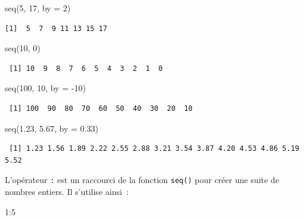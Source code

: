 \documentclass[
  letterpaper,
  DIV=11,
  numbers=noendperiod,
  oneside]{scrreprt}
\newenvironment{Shaded}{\begin{snugshade}}{\end{snugshade}}
\newcommand{\AttributeTok}[1]{\textcolor[rgb]{0.40,0.45,0.13}{#1}}
\newcommand{\DecValTok}[1]{\textcolor[rgb]{0.68,0.00,0.00}{#1}}
\newcommand{\FloatTok}[1]{\textcolor[rgb]{0.68,0.00,0.00}{#1}}
\newcommand{\FunctionTok}[1]{\textcolor[rgb]{0.28,0.35,0.67}{#1}}
\newcommand{\NormalTok}[1]{\textcolor[rgb]{0.00,0.23,0.31}{#1}}
\newcommand{\SpecialCharTok}[1]{\textcolor[rgb]{0.37,0.37,0.37}{#1}}
\begin{document}
\begin{Shaded}
\begin{Highlighting}[]
\FunctionTok{seq}\NormalTok{(}\DecValTok{5}\NormalTok{, }\DecValTok{17}\NormalTok{, }\AttributeTok{by =} \DecValTok{2}\NormalTok{)}
\end{Highlighting}
\end{Shaded}

\begin{verbatim}
[1]  5  7  9 11 13 15 17
\end{verbatim}

\begin{Shaded}
\begin{Highlighting}[]
\FunctionTok{seq}\NormalTok{(}\DecValTok{10}\NormalTok{, }\DecValTok{0}\NormalTok{)}
\end{Highlighting}
\end{Shaded}

\begin{verbatim}
 [1] 10  9  8  7  6  5  4  3  2  1  0
\end{verbatim}

\begin{Shaded}
\begin{Highlighting}[]
\FunctionTok{seq}\NormalTok{(}\DecValTok{100}\NormalTok{, }\DecValTok{10}\NormalTok{, }\AttributeTok{by =} \SpecialCharTok{{-}}\DecValTok{10}\NormalTok{)}
\end{Highlighting}
\end{Shaded}

\begin{verbatim}
 [1] 100  90  80  70  60  50  40  30  20  10
\end{verbatim}

\begin{Shaded}
\begin{Highlighting}[]
\FunctionTok{seq}\NormalTok{(}\FloatTok{1.23}\NormalTok{, }\FloatTok{5.67}\NormalTok{, }\AttributeTok{by =} \FloatTok{0.33}\NormalTok{) }
\end{Highlighting}
\end{Shaded}

\begin{verbatim}
 [1] 1.23 1.56 1.89 2.22 2.55 2.88 3.21 3.54 3.87 4.20 4.53 4.86 5.19 5.52
\end{verbatim}

L'opérateur \texttt{:} est un raccourci de la fonction \texttt{seq()}
pour créer une suite de nombres entiers. Il s'utilise ainsi~:

\begin{Shaded}
\begin{Highlighting}[]
\DecValTok{1}\SpecialCharTok{:}\DecValTok{5}
\end{Highlighting}
\end{Shaded}
\end{document}
